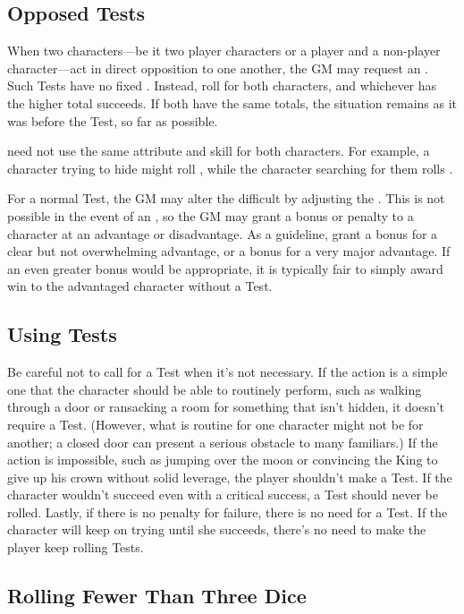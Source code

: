 \subsection{Opposed Tests}

When two characters---be it two player characters or a player and a non-player character---act in direct opposition to one another, the GM may request an {\opposedtest}.
Such Tests have no fixed {\tn}.
Instead, roll for both characters, and whichever has the higher total succeeds.
If both have the same totals, the situation remains as it was before the Test, so far as possible.

\capital{\opposedtests} need not use the same attribute and skill for both characters.
For example, a character trying to hide might roll , while the character searching for them rolls .

For a normal Test, the GM may alter the difficult by adjusting the {\tn}.
This is not possible in the event of an {\opposedtest}, so the GM may grant a bonus or penalty to a character at an advantage or disadvantage.
As a guideline, grant a  bonus for a clear but not overwhelming advantage, or a  bonus for a very major advantage.
If an even greater bonus would be appropriate, it is typically fair to simply award win to the advantaged character without a Test.

\subsection{Using Tests}

Be careful not to call for a Test when it's not necessary.
If the action is a simple one that the character should be able to routinely perform, such as walking through a door or ransacking a room for something that isn't hidden, it doesn't require a Test.
(However, what is routine for one character might not be for another; a closed door can present a serious obstacle to many familiars.)
If the action is impossible, such as jumping over the moon or convincing the King to give up his crown without solid leverage, the player shouldn't make a Test.
If the character wouldn't succeed even with a critical success, a Test should never be rolled.
Lastly, if there is no penalty for failure, there is no need for a Test.
If the character will keep on trying until she succeeds, there's no need to make the player keep rolling Tests.

\subsection{Rolling Fewer Than Three Dice}

